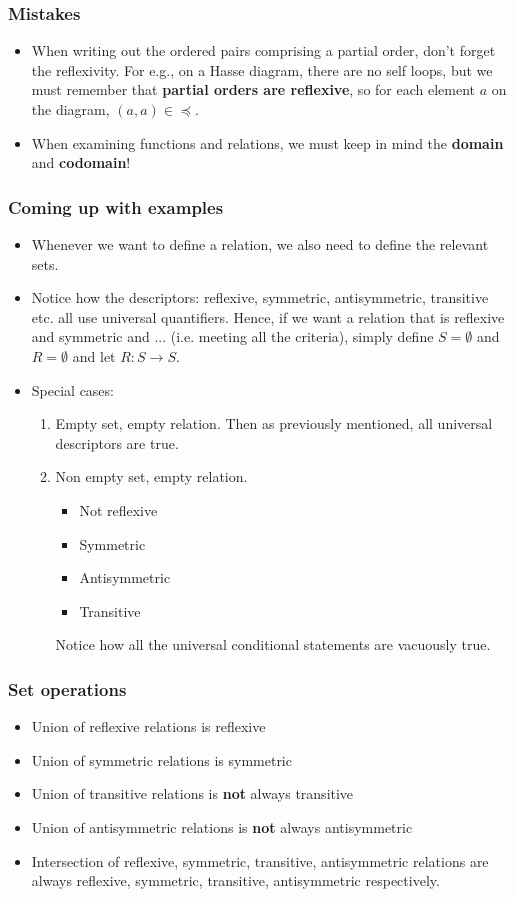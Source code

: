 \documentclass{article}
\begin{document}
\subsubsection{Mistakes}
\begin{itemize}
	\item When writing out the ordered pairs comprising a partial order, don't forget the reflexivity. For e.g., on a Hasse diagram, there are no self loops, but we must remember that \textbf{partial orders are reflexive}, so for each element $a$ on the diagram, $(a,a)\in \preceq$.
	\item When examining functions and relations, we must keep in mind the \textbf{domain} and \textbf{codomain}!
\end{itemize}

\subsubsection{Coming up with examples}
\begin{itemize}
	\item Whenever we want to define a relation, we also need to define the relevant sets.
	\item Notice how the descriptors: reflexive, symmetric, antisymmetric, transitive etc. all use universal quantifiers. Hence, if we want a relation that is reflexive and symmetric and ... (i.e. meeting all the criteria), simply define $S=\emptyset$ and $R=\emptyset$ and let $R:S\rightarrow S$.
	\item Special cases:
	\begin{enumerate}
		\item Empty set, empty relation. Then as previously mentioned, all universal descriptors are true.
		\item Non empty set, empty relation. 
		\begin{itemize}
			\item Not reflexive
			\item Symmetric
			\item Antisymmetric
			\item Transitive
		\end{itemize}
		Notice how all the universal conditional statements are vacuously true.
	\end{enumerate}
\end{itemize}

\subsubsection{Set operations}
\begin{itemize}
	\item Union of reflexive relations is reflexive
	\item Union of symmetric relations is symmetric
	\item Union of transitive relations is \textbf{not} always transitive
	\item Union of antisymmetric relations is \textbf{not} always antisymmetric
	\item Intersection of reflexive, symmetric, transitive, antisymmetric relations are always reflexive, symmetric, transitive, antisymmetric respectively.
\end{itemize}
\end{document}
